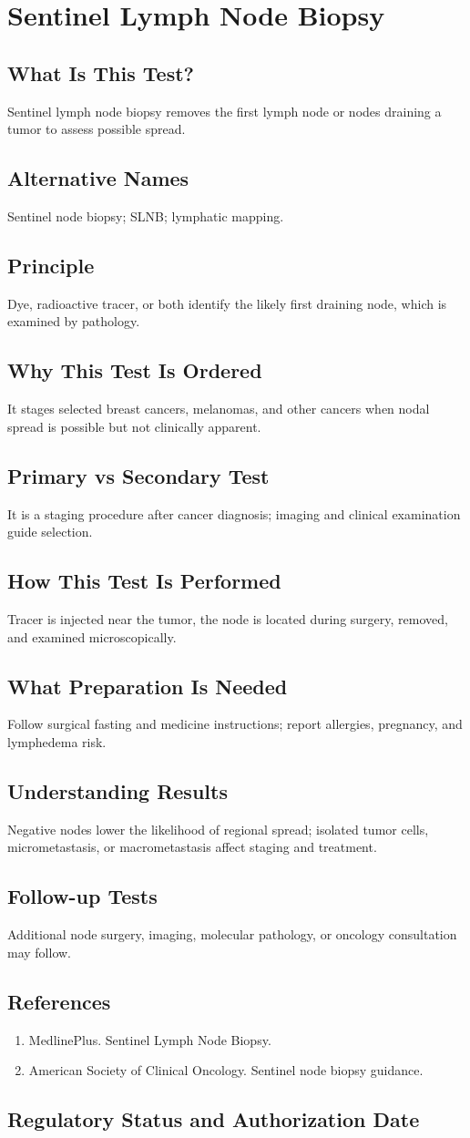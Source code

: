 \chapter{Sentinel Lymph Node Biopsy}
\section*{What Is This Test?} Sentinel lymph node biopsy removes the first lymph node or nodes draining a tumor to assess possible spread.\section*{Alternative Names} Sentinel node biopsy; SLNB; lymphatic mapping.\section*{Principle} Dye, radioactive tracer, or both identify the likely first draining node, which is examined by pathology.\section*{Why This Test Is Ordered} It stages selected breast cancers, melanomas, and other cancers when nodal spread is possible but not clinically apparent.\section*{Primary vs Secondary Test} It is a staging procedure after cancer diagnosis; imaging and clinical examination guide selection.\section*{How This Test Is Performed} Tracer is injected near the tumor, the node is located during surgery, removed, and examined microscopically.\section*{What Preparation Is Needed} Follow surgical fasting and medicine instructions; report allergies, pregnancy, and lymphedema risk.\section*{Understanding Results} Negative nodes lower the likelihood of regional spread; isolated tumor cells, micrometastasis, or macrometastasis affect staging and treatment.\section*{Follow-up Tests} Additional node surgery, imaging, molecular pathology, or oncology consultation may follow.\section*{References} \begin{enumerate}\item MedlinePlus. Sentinel Lymph Node Biopsy.\item American Society of Clinical Oncology. Sentinel node biopsy guidance.\end{enumerate}\clearpage\section*{Regulatory Status and Authorization Date}\clearpage
